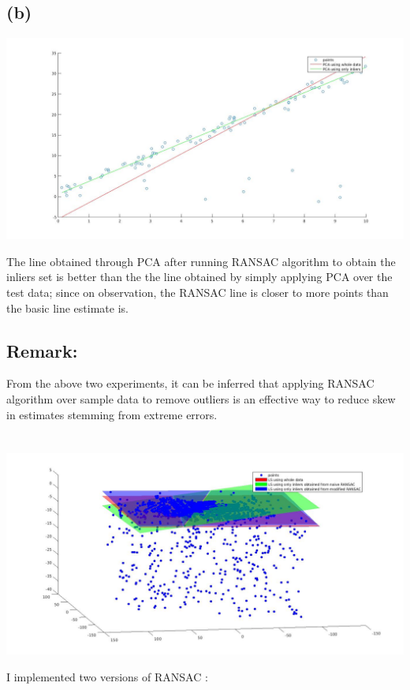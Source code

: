 \documentclass[a4paper,fleqn,11pt]{article}
\theoremstyle{mytheor}
\begin{document}
\subsection{(b)}
\begin{center}
\includegraphics[scale = 0.35]{../images/pca.jpg}
\end{center}
The line obtained through PCA after running RANSAC algorithm to obtain the inliers set is better than the the line obtained by simply applying PCA over the test data; since on observation, the RANSAC line is closer to more points than the basic line estimate is.
\subsection*{Remark:}
From the above two experiments, it can be inferred that applying RANSAC algorithm over sample data to remove outliers is an effective way to reduce skew in estimates stemming from extreme errors.
\section{}
\begin{center}
\includegraphics[scale = 0.35]{../images/q9.jpg}
\end{center}
I implemented two versions of RANSAC :
\end{document}
